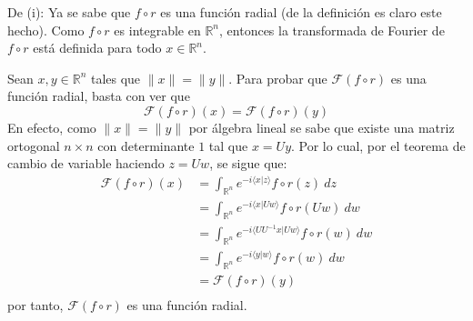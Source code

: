 \documentclass[12pt]{report}
\newcounter{it}
\theoremstyle{largebreak}
\newcommand\norm[1]{\ensuremath{\|#1\|}}
\newcommand\pint[2]{\ensuremath{\langle#1| #2\rangle}}
\newcommand{\fou}[1]{\ensuremath{\mathcal{F}#1}}
\begin{document}
    \begin{sol}
        De (i): Ya se sabe que $f\circ r$ es una función radial (de la definición es claro este hecho). Como $f\circ r$ es integrable en $\mathbb{R}^n$, entonces la transformada de Fourier de $f\circ r$ está definida para todo $x\in\mathbb{R}^n$.
        
        Sean $x,y\in\mathbb{R}^n$ tales que $\norm{x}=\norm{y}$. Para probar que $\fou{(f\circ r)}$ es una función radial, basta con ver que
        \begin{equation*}
            \fou{(f\circ r)}(x)=\fou{(f\circ r)}(y)
        \end{equation*}
        En efecto, como $\norm{x}=\norm{y}$ por álgebra lineal se sabe que existe una matriz ortogonal $n\times n$ con determinante $1$ tal que $x=Uy$. Por lo cual, por el teorema de cambio de variable haciendo $z=Uw$, se sigue que:
        \begin{equation*}
            \begin{split}
                \fou{(f\circ r)}(x)&=\int_{\mathbb{R}^n}e^{-i\pint{x}{z}}f\circ r(z)\:dz\\
                &=\int_{\mathbb{R}^n}e^{ -i\pint{x}{Uw}}f\circ r(Uw)\:dw\\
                &=\int_{\mathbb{R}^n}e^{ -i\pint{UU^{-1}x}{Uw}}f\circ r(w)\:dw\\
                &=\int_{\mathbb{R}^n}e^{ -i\pint{y}{w}}f\circ r(w)\:dw\\
                &=\fou{(f\circ r)}(y)\\
            \end{split}
        \end{equation*}
        por tanto, $\fou{(f\circ r)}$ es una función radial.


\end{sol}
\end{document}
